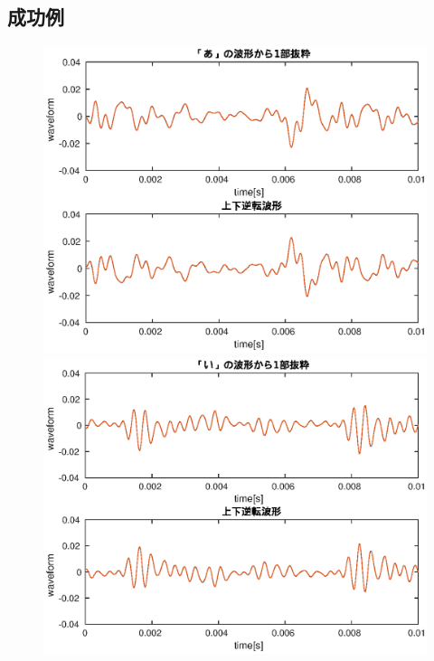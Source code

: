 \subsection{成功例}
\begin{figure}[H]
  \begin{minipage}{0.45\linewidth}
    \centering
    \includegraphics[scale=0.5]{../eps/kadai2_a.eps}
  \end{minipage}
  \begin{minipage}{0.45\linewidth}
    \centering
    \includegraphics[scale=0.5]{../eps/kadai2_i.eps}
  \end{minipage}
\end{figure}


